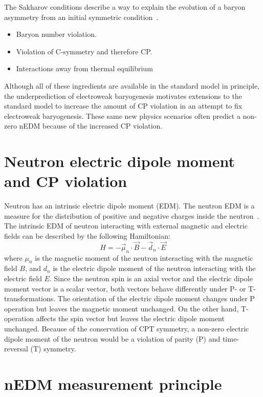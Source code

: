 The Sakharov conditions describe a way to explain the evolution of a
baryon asymmetry from an initial symmetric
condition~\cite{budker2013optical,PhysRevLett.10.531}.
\begin{itemize}
    \item Baryon number violation.
    \item Violation of C-symmetry and therefore CP.
    \item Interactions away from thermal equilibrium
\end{itemize}
Although all of these ingredients are available in the standard model
in principle, the underprediction of electroweak baryogenesis
motivates extensions to the standard model to increase the amount of
CP violation in an attempt to fix electroweak baryogenesis.  These
same new physics scenarios often predict a non-zero nEDM because of
the increased CP violation.


\section{Neutron electric dipole moment and CP violation }  

Neutron has an intrinsic electric dipole moment (EDM).  The neutron
EDM is a measure for the distribution of positive and negative charges
inside the neutron~\cite{bib:chuppetal}.  The intrinsic EDM of neutron
interacting with external magnetic and electric fields can be
described by the following Hamiltonian:
\begin{equation}\label{my_first_eqn}  
  H=-\vec{\mu}_n\cdot\vec{B}-\vec{d}_n\cdot\vec{E}
\end{equation}
where $\mu_n$ is the magnetic moment of the neutron interacting with
the magnetic field $B$, and $d_n$ is the electric dipole moment of the
neutron interacting with the electric field $E$.  Since the neutron
spin is an axial vector and the electric dipole moment vector is a
scalar vector, both vectors behave differently under P- or
T-transformations.  The orientation of the electric dipole moment
changes under P operation but leaves the magnetic moment unchanged. On
the other hand, T-operation affects the spin vector but leaves the
electric dipole moment unchanged.  Because of the conservation of CPT
symmetry, a non-zero electric dipole moment of the neutron would be a
violation of parity (P) and time-reversal (T) symmetry.

\section{nEDM measurement principle}


